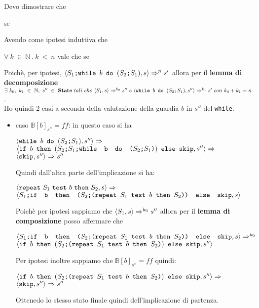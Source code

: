 {	 Devo dimostrare che 
	\begin{center}
	se 
	\end{center}
	Avendo come ipotesi induttiva che 
	\begin{center}
	$\forall{}~k~\in~\mathbb{N}~.~k~<~n$ vale che se 
	\end{center}
	Poichè, per ipotesi, $\confSs{\PDef{}}{s}\Rar{n}s'$ allora per il
	\textbf{lemma di decomposizione} \\ $\exists{}~k_0,~k_1~\in~\mathbb{N},~
	s''~\in~\states{}~tali~che~\confSs{S_1}{s}\Rar{k_0}s''~e~\confSs{
	\wbS{b}{(\concat{$S_2$}{$S_1$})}}{s''}\Rar{k_1}s'~con~k_0+k_1=n$.\\
	Ho quindi 2 casi a seconda della valutazione della guardia $b$ in $s''$ del
	\texttt{while}.
	\begin{itemize}
		\item caso $\mathbb{B}[b]_{s''}=ff$: in questo caso si ha 
		\begin{center}
		$\confSs{\wbS{b}{(\concat{$S_2$}{$S_1$})}}{s''}\Rar{}$\\
		$\confSs{\ifABC{b}{(\concat{\concat{$S_2$}{$S_1$}}
		{\wbS{b}{(\concat{$S_2$}{$S_1$})}})}{\skipistr}}{s''}\Rar{}$\\
		$\confSs{\skipistr}{s''}\Rar{}s''$
		\end{center}
		Quindi dall'altra parte dell'implicazione si ha:
		\begin{center}
		$\confSs{\repeatSbS{S_1}{b}{S_2}}{s}\Rar{}$\\
		$\confSs{\concat{$S_1$}{\ifABC{b}{(\concat{$S_2$}
		{(\repeatSbS{$S_1$}{$b$}{$S_2$})})}{\skipistr}}}{s}$
		\end{center}
		Poichè per ipotesi sappiamo che $\confSs{S_1}{s}\Rar{k_0}s''$ allora
		per il \textbf{lemma di composizione} posso affermare che
		\begin{center}
		$\confSs{\concat{$S_1$}{\ifABC{b}{(\concat{$S_2$}
		{(\repeatSbS{$S_1$}{$b$}{$S_2$})})}{\skipistr}}}{s}\Rar{k_0}$\\
		$\confSs{
			\ifABC{b}{(\concat{$S_2$}{(\repeatSbS{$S_1$}{$b$}{$S_2$})})} 
			{\skipistr}}{s''}$
		\end{center}
		Per ipotesi inoltre sappiamo che $\mathbb{B}[b]_{s''}=ff$ quindi:
		\begin{center}
		$\confSs{
			\ifABC{b}{(\concat{$S_2$}{(\repeatSbS{$S_1$}{$b$}{$S_2$})})} 
			{\skipistr}}{s''}\Rar{}$\\
		$\confSs{\skipistr}{s''}\Rar{}s''$
		\end{center}
		Ottenedo lo stesso stato finale quindi dell'implicazione di partenza.


\end{itemize}}
